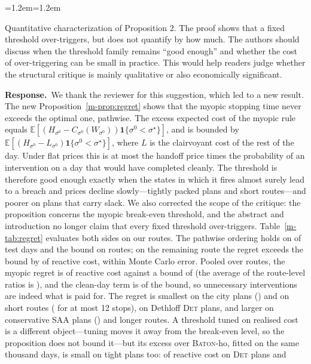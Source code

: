 \documentclass[11pt]{article}
\newenvironment{comment}{\par\medskip\noindent\color{rev}\itshape
  \begin{list}{}{\leftmargin=1.2em\rightmargin=1.2em}\item[]}%
  {\end{list}\par}
\newcommand{\resp}{\par\noindent\textbf{Response.}\ }
\newcommand{\tref}[1]{Table~\ref{m-#1}}
\newcommand{\BATON}{\textsc{Baton}}
\begin{document}
\begin{comment}
Quantitative characterization of Proposition 2. The proof shows that a
fixed threshold over-triggers, but does not quantify by how much. The
authors should discuss when the threshold family remains ``good
enough'' and whether the cost of over-triggering can be small in
practice. This would help readers judge whether the structural critique
is mainly qualitative or also economically significant.
\end{comment}
\resp We thank the reviewer for this suggestion, which led to a new
result. The new Proposition~\ref{m-prop:regret} shows that the myopic
stopping time never exceeds the optimal one, pathwise. The excess
expected cost of the myopic rule equals
$\mathbb E[(H_{\sigma^0} - C_{\sigma^0}(W_{\sigma^0}))
\mathbf 1\{\sigma^0 < \sigma^\star\}]$, and is bounded by
$\mathbb E[(H_{\sigma^0} - L_{\sigma^0})\mathbf 1\{\sigma^0 <
\sigma^\star\}]$, where $L$ is the clairvoyant cost of the rest of the
day. Under flat prices this is at most the handoff price times the
probability of an intervention on a day that would have completed
cleanly. The threshold is therefore good enough exactly when the states
in which it fires almost surely lead to a breach and prices decline
slowly---tightly packed plans and short routes---and poorer on plans
that carry slack. We also corrected the scope of the critique: the
proposition concerns the myopic break-even threshold, and the abstract
and introduction no longer claim that every fixed threshold
over-triggers. \tref{tab:regret} evaluates both sides on our routes.
The pathwise ordering holds on \regretContained{} of test days and the
bound on \regretBoundHolds{} routes; on the remaining route the regret
exceeds the bound by \regretFailMax{} of reactive cost, within Monte
Carlo error. Pooled over routes, the myopic regret is \regretAll{} of
reactive cost against a bound of \regretBoundAll{} (the average of the
route-level ratios is \regretRouteMean), and the clean-day term is
\regretCleanShare{} of the bound, so unnecessary interventions are
indeed what is paid for. The regret is smallest on the city plans
(\regretCity) and on short routes (\regretShort{} for at most 12 stops),
\regretDet{} on Dethloff \textsc{Det} plans, and larger on conservative
\textsc{SAA} plans (\regretSaa) and longer routes. A threshold tuned on
realised cost is a different object---tuning moves it away from the
break-even level, so the proposition does not bound it---but its excess
over \BATON-ho, fitted on the same thousand days, is small on tight
plans too: \thrGapDet{} of reactive cost on \textsc{Det} plans and
\end{document}
